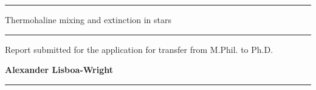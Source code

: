 \documentclass[12pt, a4paper]{report}
\begin{document}
\begin{titlepage}

\vspace*{-0.4cm}

\begin{center}
\hrule
\vspace*{0.5cm}
{\Huge \sc Thermohaline mixing and extinction in stars \par}
\vspace*{0.5cm}
\hrule

\vspace*{5mm}
{\normalsize Report submitted for the application for transfer from M.Phil. to Ph.D.}

\vfill

{\bf Alexander Lisboa-Wright}

\end{center}

\vspace*{1.0cm}

\hrule
\vspace*{0.2cm}
\\

\end{titlepage}

\begin{abstract}
So far in this project, the potential effects of thermohaline mixing in red-giant branch star models have been studied and their projected effect on local mass fractions of $^{14}$N has been calculated. This effect is deemed to be highly significant, which will allow for the full implementation of thermohaline mixing in the models.
The impact of fundamental stellar parameters on the ratio of values of interstellar extinction in different telescope filters has also been studied. The impact is significant and has been partially modelled using simple functions of the stellar parameters, a process which is ongoing at the time of writing.
\end{abstract}
\end{document}
